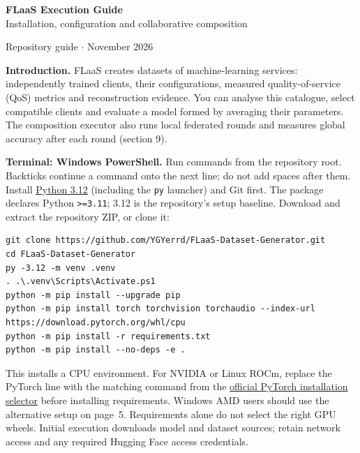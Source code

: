 \documentclass[10pt,a4paper]{article}
\makeatletter
\newcommand{\code}[1]{\nolinkurl{#1}}
\renewcommand\section{\@startsection{section}{1}{0pt}{-1.8ex plus -.2ex}{.7ex}{\normalfont\large\bfseries\color{ink}}}
\makeatother
\begin{document}
\fontsize{9.5}{10.8}\selectfont
\begin{center}
{\LARGE\bfseries\color{ink} FLaaS Execution Guide}\\[3pt]
{\normalsize Installation, configuration and collaborative composition}\par
{\small Repository guide \enspace$\cdot$ November 2026}
\end{center}

\textbf{Introduction.} FLaaS creates datasets of machine-learning services: independently trained clients, their configurations, measured quality-of-service (QoS) metrics and reconstruction evidence. You can analyse this catalogue, select compatible clients and evaluate a model formed by averaging their parameters. The composition executor also runs local federated rounds and measures global accuracy after each round (section 9).

\section{Quick Start}
\textbf{Terminal: Windows PowerShell.} Run commands from the repository root. Backticks continue a command onto the next line; do not add spaces after them. Install \href{https://www.python.org/downloads/windows/}{Python 3.12} (including the \code{py} launcher) and Git first. The package declares Python \code{>=3.11}; 3.12 is the repository's setup baseline. Download and extract the repository ZIP, or clone it:
\begin{lstlisting}
git clone https://github.com/YGYerrd/FLaaS-Dataset-Generator.git
cd FLaaS-Dataset-Generator
py -3.12 -m venv .venv
. .\.venv\Scripts\Activate.ps1
python -m pip install --upgrade pip
python -m pip install torch torchvision torchaudio --index-url https://download.pytorch.org/whl/cpu
python -m pip install -r requirements.txt
python -m pip install --no-deps -e .
\end{lstlisting}
This installs a CPU environment. For NVIDIA or Linux ROCm, replace the PyTorch line with the matching command from the \href{https://pytorch.org/get-started/locally/}{official PyTorch installation selector} before installing requirements. Windows AMD users should use the alternative setup on page~5. Requirements alone do not select the right GPU wheels. Initial execution downloads model and dataset sources; retain network access and any required Hugging Face access credentials.
\end{document}
